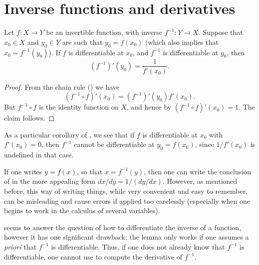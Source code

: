 \section{Inverse functions and derivatives}\label{i:sec:10.4}

\begin{lem}\label{i:10.4.1}
  Let \(f : X \to Y\) be an invertible function, with inverse \(f^{-1} : Y \to X\).
  Suppose that \(x_0 \in X\) and \(y_0 \in Y\) are such that \(y_0 = f(x_0)\)
  (which also implies that \(x_0 = f^{-1}(y_0)\)).
  If \(f\) is differentiable at \(x_0\), and \(f^{-1}\) is differentiable at \(y_0\), then
  \[
    (f^{-1})'(y_0) = \dfrac{1}{f'(x_0)}.
  \]
\end{lem}

\begin{proof}
  From the chain rule () we have
  \[
    (f^{-1} \circ f)'(x_0) = (f^{-1})'(y_0) f'(x_0).
  \]
  But \(f^{-1} \circ f\) is the identity function on \(X\), and hence by  \((f^{-1} \circ f)'(x_0) = 1\).
  The claim follows.
\end{proof}

\begin{note}
  As a particular corollary of , we see that if \(f\) is differentiable at \(x_0\) with \(f'(x_0) = 0\), then \(f^{-1}\) cannot be differentiable at \(y_0 = f(x_0)\), since \(1 / f'(x_0)\) is undefined in that case.
\end{note}

\begin{note}
  If one writes \(y = f(x)\), so that \(x = f^{-1}(y)\), then one can write the conclusion of  in the more appealing form \(dx / dy = 1 / (dy / dx)\).
  However, as mentioned before, this way of writing things, while very convenient and easy to remember, can be misleading and cause errors if applied too carelessly (especially when one begins to work in the calculus of several variables).
\end{note}

\begin{note}
   seems to answer the question of how to differentiate the inverse of a function, however it has one significant drawback:
  the lemma only works if one assumes a \emph{priori} that \(f^{-1}\) is differentiable.
  Thus, if one does not already know that \(f^{-1}\) is differentiable, one cannot use  to compute the derivative of \(f^{-1}\).
\end{note}


